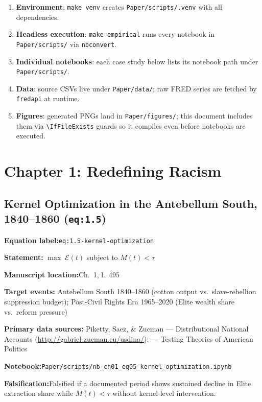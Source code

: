 \documentclass[12pt]{article}
\newcommand{\TierOne}{\textcolor{green!60!black}{\textbf{T1}}}
\newcommand{\caserow}[2]{%
  \noindent\textbf{#1:}\enspace #2\par\smallskip}
\begin{document}
\begin{enumerate}
  \item \textbf{Environment}: \texttt{make venv} creates
    \texttt{Paper/scripts/.venv} with all dependencies.
  \item \textbf{Headless execution}: \texttt{make empirical} runs every
    notebook in \texttt{Paper/scripts/} via \texttt{nbconvert}.
  \item \textbf{Individual notebooks}: each case study below lists its
    notebook path under \texttt{Paper/scripts/}.
  \item \textbf{Data}: source CSVs live under \texttt{Paper/data/};
    raw FRED series are fetched by \texttt{fredapi} at runtime.
  \item \textbf{Figures}: generated PNGs land in \texttt{Paper/figures/};
    this document includes them via \verb|\IfFileExists| guards so it
    compiles even before notebooks are executed.
\end{enumerate}

\section{Chapter 1: Redefining Racism}

\subsection{Kernel Optimization in the Antebellum South, 1840--1860
  (\texttt{eq:1.5})}

\begin{tcolorbox}[caseblock, title={%
  \TierOne\quad Kernel Optimization in the Antebellum South, 1840--1860}]

\caserow{Equation label}{\texttt{eq:1.5-kernel-optimization}}
\caserow{Statement}{%
  $\max\; \mathcal{E}(t)$ \quad subject to \quad $M(t) < \tau$}
\caserow{Manuscript location}{Ch.~1, l.~495}
\caserow{Target events}{%
  Antebellum South 1840--1860 (cotton output vs.\ slave-rebellion
  suppression budget); Post-Civil Rights Era 1965--2020 (Elite wealth
  share vs.\ reform pressure)}
\caserow{Primary data sources}{%
  Piketty, Saez, \& Zucman --- Distributional National Accounts
  (\url{http://gabriel-zucman.eu/usdina/});
  \textcite{gilens} --- Testing Theories of American Politics}
\caserow{Notebook}{\texttt{Paper/scripts/nb\_ch01\_eq05\_kernel\_optimization.ipynb}}
\caserow{Falsification}{Falsified if a documented period shows sustained
  decline in Elite extraction share while $M(t)<\tau$ without
  kernel-level intervention.}

\end{tcolorbox}
\end{document}
